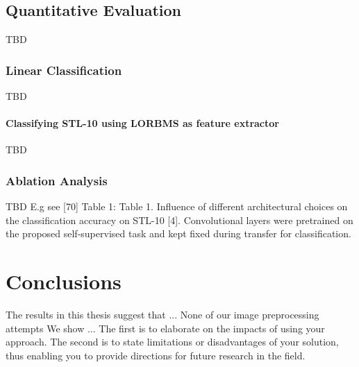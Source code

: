 \documentclass[12pt,a4paper]{article}
\begin{document}
\subsection{Quantitative Evaluation}
TBD
\subsubsection{Linear Classification}\label{subsec:linearclassifier}
TBD
\paragraph{Classifying STL-10 using LORBMS as feature extractor}
TBD

\subsubsection{Ablation Analysis}
TBD
E.g see [70] Table 1:
Table 1. Influence of different architectural choices on the classification
accuracy on STL-10 [4]. Convolutional layers were pretrained
on the proposed self-supervised task and kept fixed during
transfer for classification.



\section{Conclusions}
The results in this thesis suggest that ...
None of our image preprocessing attempts
We show ...
The first is
to elaborate on the impacts of using your approach. The
second is to state limitations or disadvantages of your solution,
thus enabling you to provide directions for future
research in the field.

\end{document}
